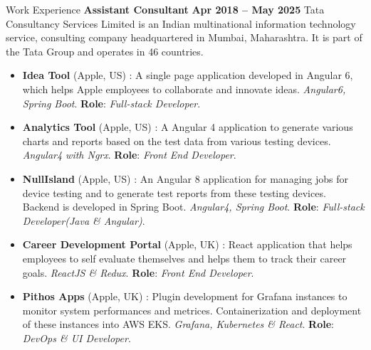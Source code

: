 \documentclass{resume}
\begin{document}
\begin{category}{Work Experience}
  \citemnobullet \textbf{Assistant Consultant} \hfill \textbf{Apr 2018 -- May 2025}
  \citemnobullet Tata Consultancy Services Limited is an Indian multinational information technology service, consulting company headquartered in Mumbai, Maharashtra. It is part of the Tata Group and operates in 46 countries.
  \begin{itemize}
  \item \textbf{Idea Tool} (Apple, US) : A single page application developed in Angular 6, which helps Apple employees to collaborate and innovate ideas. {\em Angular6, Spring Boot}. \textbf{Role}: {\em Full-stack Developer}. 
  \item \textbf{Analytics Tool} (Apple, US) : A Angular 4 application to generate various charts and reports based on the test data from various testing devices. {\em Angular4 with Ngrx}. \textbf{Role}: {\em Front End Developer}. 
  \item \textbf{NullIsland} (Apple, US) : An Angular 8 application for managing jobs for device testing and to generate test reports from these testing devices. Backend is developed in Spring Boot. {\em Angular4, Spring Boot}. \textbf{Role}: {\em Full-stack Developer(Java \& Angular)}. 
  \item \textbf{Career Development Portal} (Apple, UK) : React application that helps employees to self evaluate themselves and helps them to track their career goals. {\em ReactJS \& Redux}. \textbf{Role}: {\em Front End Developer}. 
  \item \textbf{Pithos Apps} (Apple, UK) : Plugin development for Grafana instances to monitor system performances and metrices. Containerization and deployment of these instances into AWS EKS. {\em Grafana, Kubernetes \& React}. \textbf{Role}: {\em DevOps \& UI Developer}.   
  \end{itemize}


\end{category}
\end{document}
